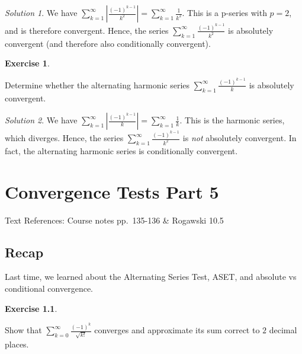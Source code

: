 \documentclass[
]{book}
\theoremstyle{definition}
\theoremstyle{definition}
\theoremstyle{definition}
\newtheorem{exercise}{Exercise}[chapter]
\theoremstyle{definition}
\theoremstyle{remark}
\newtheorem*{solution}{Solution}
\begin{document}
\begin{solution}

We have \(\displaystyle \sum_{k=1}^\infty \left | \frac{(-1)^{k-1}}{k^2} \right | =\sum_{k=1}^\infty \frac{1}{k^2}\). This is a p-series with \(p=2\), and is therefore convergent. Hence, the series \(\displaystyle \sum_{k=1}^\infty \frac{(-1)^{k-1}}{k^2}\) is absolutely convergent (and therefore also conditionally convergent).

\end{solution}

\begin{exercise}
\protect\hypertarget{exr:unlabeled-div-225}{}\label{exr:unlabeled-div-225}

Determine whether the alternating harmonic series \(\displaystyle \sum_{k=1}^\infty \frac{(-1)^{k-1}}{k}\) is absolutely convergent.

\end{exercise}

\begin{solution}

We have \(\displaystyle \sum_{k=1}^\infty \left | \frac{(-1)^{k-1}}{k} \right | =\sum_{k=1}^\infty \frac{1}{k}\). This is the harmonic series, which diverges. Hence, the series \(\displaystyle \sum_{k=1}^\infty \frac{(-1)^{k-1}}{k^2}\) is \emph{not} absolutely convergent. In fact, the alternating harmonic series is conditionally convergent.

\end{solution}

\hypertarget{lec-30}{%
\chapter{Convergence Tests Part 5}\label{lec-30}}

Text References: Course notes pp.~135-136 \& Rogawski 10.5

\hypertarget{recap-28}{%
\section{Recap}\label{recap-28}}

Last time, we learned about the Alternating Series Test, ASET, and absolute vs conditional convergence.

\begin{exercise}
\protect\hypertarget{exr:unlabeled-div-227}{}\label{exr:unlabeled-div-227}

Show that \(\displaystyle \sum_{k=0}^\infty \frac{(-1)^k}{\sqrt{k!}}\) converges and approximate its sum correct to \(2\) decimal places.

\end{exercise}
\end{document}
